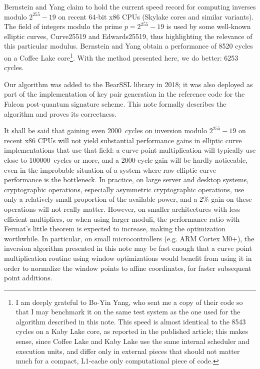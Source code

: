 \documentclass{llncs}
\begin{document}
Bernstein and Yang claim to hold the current speed record for computing
inverses modulo $2^{255}-19$ on recent 64-bit x86 CPUs (Skylake cores
and similar variants). The field of integers modulo the prime $p =
2^{255}-19$ is used by some well-known elliptic curves, Curve25519 and
Edwards25519, thus highlighting the relevance of this particular
modulus. Bernstein and Yang obtain a performance of 8520 cycles on a
Coffee Lake core\footnote{I am deeply grateful to Bo-Yin Yang, who sent
me a copy of their code so that I may benchmark it on the same test
system as the one used for the algorithm described in this note. This
speed is almost identical to the 8543 cycles on a Kaby Lake core, as
reported in the published article; this makes sense, since Coffee Lake
and Kaby Lake use the same internal scheduler and execution units, and
differ only in external pieces that should not matter much for a
compact, L1-cache only computational piece of code.}. With the method
presented here, we do better: 6253 cycles.

Our algorithm was added to the BearSSL library\cite{BearSSL} in 2018; it
was also deployed as part of the implementation of key pair generation
in the reference code for the Falcon post-quantum signature
scheme\cite{Falcon}. This note formally describes the algorithm and
proves its correctness.

It shall be said that gaining even 2000~cycles on inversion modulo
$2^{255}-19$ on recent x86 CPUs will not yield substantial performance
gains in elliptic curve implementations that use that field: a curve
point multiplication will typically use close to 100000~cycles or more,
and a 2000-cycle gain will be hardly noticeable, even in the improbable
situation of a system where raw elliptic curve performance is the
bottleneck. In practice, on large server and desktop systems,
cryptographic operations, especially asymmetric cryptographic
operations, use only a relatively small proportion of the available
power, and a 2\% gain on these operations will not really matter.
However, on smaller architectures with less efficient multipliers, or
when using larger moduli, the performance ratio with Fermat's little
theorem is expected to increase, making the optimization worthwhile. In
particular, on small microcontrollers (e.g. ARM Cortex M0+), the
inversion algorithm presented in this note may be fast enough that a
curve point multiplication routine using window optimizations would
benefit from using it in order to normalize the window points to affine
coordinates, for faster subsequent point additions.
\end{document}
